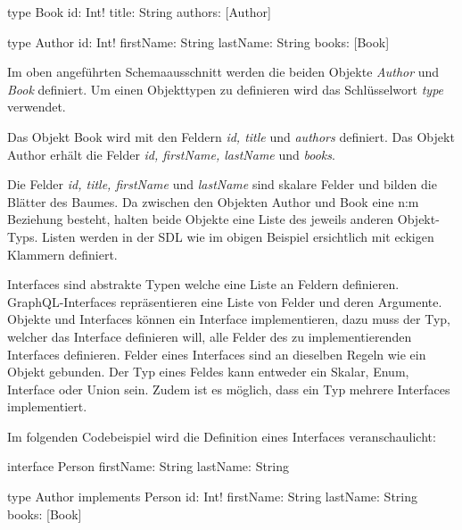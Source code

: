 \begin{JsCode}
type Book {
    id: Int!
    title: String
    authors: [Author]
}
    
type Author {
    id: Int!
    firstName: String
    lastName: String
    books: [Book]
}
\end{JsCode}

Im oben angeführten Schemaausschnitt werden die beiden Objekte \textit{Author} und \textit{Book} definiert.
Um einen Objekttypen zu definieren wird das Schlüsselwort \textit{type} verwendet.

Das Objekt Book wird mit den Feldern \textit{id, title} und \textit{authors} definiert.
Das Objekt Author erhält die Felder \textit{id, firstName, lastName} und \textit{books}.

Die Felder \textit{id, title, firstName} und \textit{lastName} sind skalare Felder und bilden die Blätter des Baumes.
Da zwischen den Objekten Author und Book eine n:m Beziehung besteht, halten beide Objekte eine Liste des jeweils anderen Objekt-Typs.
Listen werden in der SDL wie im obigen Beispiel ersichtlich mit eckigen Klammern definiert.

Interfaces sind abstrakte Typen welche eine Liste an Feldern definieren.
GraphQL-Interfaces repräsentieren eine Liste von Felder und deren Argumente.
Objekte und Interfaces können ein Interface implementieren, dazu muss der Typ, welcher das Interface definieren will, alle Felder des zu implementierenden Interfaces definieren.
\newline
\cite[Abs. 3.7]{graphqlOnline}
Felder eines Interfaces sind an dieselben Regeln wie ein Objekt gebunden.
Der Typ eines Feldes kann entweder ein Skalar, Enum, Interface oder Union sein.
Zudem ist es möglich, dass ein Typ mehrere Interfaces implementiert.
\cite[S.65-66]{kress2020graphql}
\newline


Im folgenden Codebeispiel wird die Definition eines Interfaces veranschaulicht:

\begin{JsCode}
interface Person {
    firstName: String
    lastName: String
}

type Author implements Person {
    id: Int!
    firstName: String
    lastName: String
    books: [Book]
}
\end{JsCode}

